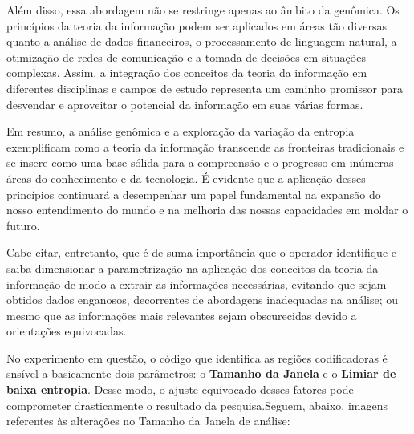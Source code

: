 \documentclass{article}
\begin{document}
Além disso, essa abordagem não se restringe apenas ao âmbito da genômica. Os princípios da teoria da informação podem ser aplicados em áreas tão diversas quanto a análise de dados financeiros, o processamento de linguagem natural, a otimização de redes de comunicação e a tomada de decisões em situações complexas. Assim, a integração dos conceitos da teoria da informação em diferentes disciplinas e campos de estudo representa um caminho promissor para desvendar e aproveitar o potencial da informação em suas várias formas.

Em resumo, a análise genômica e a exploração da variação da entropia exemplificam como a teoria da informação transcende as fronteiras tradicionais e se insere como uma base sólida para a compreensão e o progresso em inúmeras áreas do conhecimento e da tecnologia. É evidente que a aplicação desses princípios continuará a desempenhar um papel fundamental na expansão do nosso entendimento do mundo e na melhoria das nossas capacidades em moldar o futuro.

Cabe citar, entretanto, que é de suma importância que o operador identifique e saiba dimensionar a parametrização na aplicação dos conceitos da teoria da informação de modo a extrair as informações necessárias, evitando que sejam obtidos dados enganosos, decorrentes de abordagens inadequadas na análise; ou mesmo que as informações mais relevantes sejam obscurecidas devido a orientações equivocadas. 

No experimento em questão, o código que identifica as regiões codificadoras é snsível a basicamente dois parâmetros: o \textbf{Tamanho da Janela} e o \textbf{Limiar de baixa entropia}. Desse modo, o ajuste equivocado desses fatores pode comprometer drasticamente o resultado da pesquisa.Seguem, abaixo, imagens referentes às alterações no Tamanho da Janela de análise:
\end{document}
